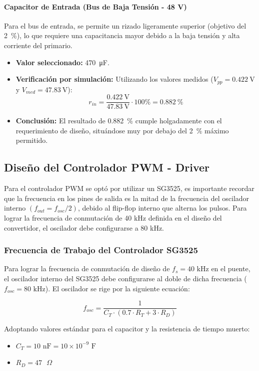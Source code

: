\documentclass[11pt, a4paper]{article}
\begin{document}
\paragraph{Capacitor de Entrada (Bus de Baja Tensión - 48 V)}
Para el bus de entrada, se permite un rizado ligeramente superior (objetivo del \SI{2}{\percent}), lo que requiere una capacitancia mayor debido a la baja tensión y alta corriente del primario.

\begin{itemize}
    \item \textbf{Valor seleccionado:} \SI{470}{\micro\farad}.
    \item \textbf{Verificación por simulación:} Utilizando los valores medidos ($V_{pp} = \SI{0.422}{\volt}$ y $V_{med} = \SI{47.83}{\volt}$):
    \begin{equation}
        r_{in} = \frac{\SI{0.422}{\volt}}{\SI{47.83}{\volt}} \cdot 100\% = \SI{0.882}{\percent}
    \end{equation}
    \item \textbf{Conclusión:} El resultado de \SI{0.882}{\percent} cumple holgadamente con el requerimiento de diseño, situándose muy por debajo del \SI{2}{\percent} máximo permitido.
\end{itemize}


\subsection{Diseño del Controlador PWM - Driver}
Para el controlador PWM se optó por utilizar un SG3525, es importante recordar que la frecuencia en los
pines de salida es la mitad de la frecuencia del oscilador interno
$\left(f_{out} = f_{osc}/2\right)$, debido al flip-flop interno que alterna los
pulsos. Para lograr la frecuencia de conmutación de 40 kHz definida en el
diseño del convertidor, el oscilador debe configurarse a 80 kHz.


\subsubsection{Frecuencia de Trabajo del Controlador SG3525}
Para lograr la frecuencia de conmutación de diseño de $f_s = 40\text{ kHz}$ en el puente, el oscilador interno del SG3525 debe configurarse al doble de dicha frecuencia ($f_{osc} = 80\text{ kHz}$). El oscilador se rige por la siguiente ecuación:

$$f_{osc} = \frac{1}{C_T \cdot (0.7 \cdot R_T + 3 \cdot R_D)}$$

Adoptando valores estándar para el capacitor y la resistencia de tiempo muerto:
\begin{itemize}
    \item $C_T = 10\text{ nF} = 10 \times 10^{-9}\text{ F}$
    \item $R_D = 47\text{ }\Omega$
\end{itemize}
\end{document}
